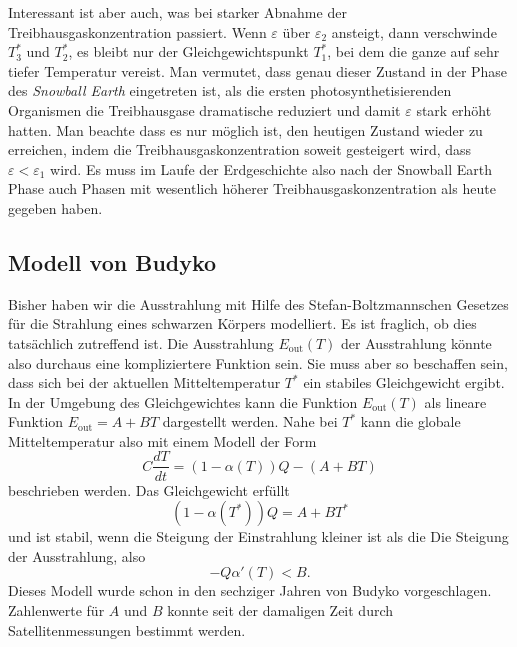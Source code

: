 Interessant ist aber auch, was bei starker Abnahme der
Treibhausgaskonzentration passiert.
Wenn $\varepsilon$ über $\varepsilon_2$ ansteigt, dann verschwinde
$T_3^*$ und $T_2^*$, es bleibt nur der Gleichgewichtspunkt $T_1^*$,
bei dem die ganze auf sehr tiefer Temperatur vereist.
Man vermutet, dass genau dieser Zustand in der Phase des {\em Snowball Earth}
eingetreten ist, als die ersten photosynthetisierenden Organismen die
Treibhausgase dramatische reduziert und damit $\varepsilon$ stark
erhöht hatten.
Man beachte dass es nur möglich ist, den heutigen Zustand wieder zu 
erreichen, indem die Treibhausgaskonzentration soweit gesteigert
wird, dass $\varepsilon<\varepsilon_1$ wird.
Es muss im Laufe der Erdgeschichte also nach der Snowball Earth Phase
auch Phasen mit wesentlich höherer Treibhausgaskonzentration als heute
gegeben haben.

\subsection{Modell von Budyko\label{subsection:modell von budyko}}
Bisher haben wir die Ausstrahlung mit Hilfe des Stefan-Boltzmannschen
Gesetzes für die Strahlung eines schwarzen Körpers modelliert.
Es ist fraglich, ob dies tatsächlich zutreffend ist.
Die Ausstrahlung $E_\text{out}(T)$ der Ausstrahlung könnte also durchaus
eine kompliziertere Funktion sein.
Sie muss aber so beschaffen sein, dass sich bei der aktuellen
Mitteltemperatur $T^*$ ein stabiles Gleichgewicht ergibt.
In der Umgebung des Gleichgewichtes kann die Funktion $E_\text{out}(T)$
als lineare Funktion
$E_\text{out}= A+BT$
dargestellt werden.
Nahe bei $T^*$ kann die globale Mitteltemperatur also mit einem Modell
der Form
\begin{equation}
C
\frac{dT}{dt}
=
(1-\alpha(T)) Q- (A+BT)
\end{equation}
beschrieben werden.
Das Gleichgewicht erfüllt
\[
(1-\alpha(T^*))Q=A+BT^*
\] 
und ist stabil, wenn die Steigung der Einstrahlung kleiner ist als die
Die Steigung der Ausstrahlung, also
\begin{equation}
-Q\alpha'(T)
<
B.
\label{skript:budyko:cond}
\end{equation}
Dieses Modell wurde schon in den sechziger Jahren von Budyko vorgeschlagen.
Zahlenwerte für $A$ und $B$ konnte seit der damaligen Zeit durch
Satellitenmessungen bestimmt werden.

